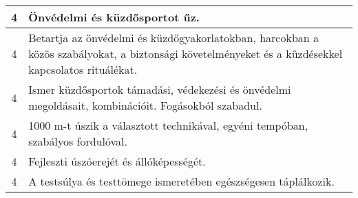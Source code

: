 \begin{longtable}{c | p{12cm} }
                                
                                          4 &  Önvédelmi és küzdősportot űz. \\ \hline
                                          4 &  Betartja az önvédelmi és küzdőgyakorlatokban, harcokban a közös szabályokat, a biztonsági követelményeket és a küzdésekkel kapcsolatos rituálékat. \\ \hline
                                          4 &  Ismer küzdősportok támadási, védekezési és önvédelmi megoldásait, kombinációit. Fogásokból szabadul. \\ \hline
                                          4 &  1000 m-t  úszik a választott technikával, egyéni tempóban, szabályos fordulóval. \\ \hline
                                          4 &  Fejleszti úszóerejét és állóképességét. \\ \hline
                                          4 &  A testsúlya és testtömege ismeretében egészségesen táplálkozik. \\ \hline
                                      
                        \end{longtable}
            \clearpage

